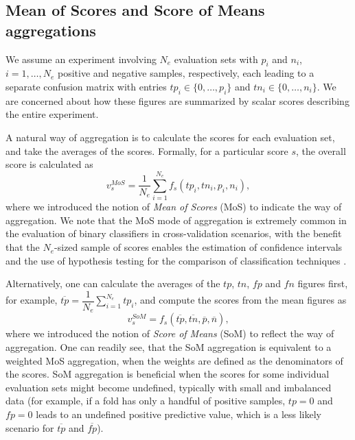 \documentclass[5p, final]{elsarticle}
\begin{document}
\subsection{Mean of Scores and Score of Means aggregations}
\label{sec:rommor}

We assume an experiment involving $N_e$ evaluation sets with $p_i$ and $n_i$, $i=1,\dots,N_e$ positive and negative samples, respectively, each leading to a separate confusion matrix with entries $tp_i \in\lbrace 0, \dots, p_i\rbrace$ and $tn_i\in\lbrace 0, \dots, n_i\rbrace$. We are concerned about how these figures are summarized by scalar scores describing the entire experiment. 

A natural way of aggregation is to calculate the scores for each evaluation set, and take the averages of the scores. Formally, for a particular score $s$, the overall score is calculated as
\begin{equation}
\label{estmor}
v_s^{MoS} = \dfrac{1}{N_e}\sum\limits_{i=1}^{N_e} f_s(tp_{i}, tn_{i}, p_{i}, n_{i}),
\end{equation}
where we introduced the notion of \emph{Mean of Scores} (MoS) to indicate the way of aggregation. We note that the MoS mode of aggregation is extremely common in the evaluation of binary classifiers in cross-validation scenarios, with the benefit that the $N_e$-sized sample of scores enables the estimation of confidence intervals \cite{morex2} and the use of  hypothesis testing for the comparison of classification techniques \cite{morex0}.

Alternatively, one can calculate the averages of the $tp$, $tn$, $fp$ and $fn$ figures first, for example, $\overline{tp} = \dfrac{1}{N_e}\sum\limits_{i=1}^{N_e} tp_i$, and compute the scores from the mean figures as
\begin{equation}
\label{estrom}
v_s^{SoM} = f_s\left(\overline{tp}, \overline{tn}, \overline{p}, \overline{n}\right),
\end{equation}
where we introduced the notion of \emph{Score of Means} (SoM) to reflect the way of aggregation. One can readily see, that the SoM aggregation is equivalent to a weighted MoS aggregation, when the weights are defined as the denominators of the scores. SoM aggregation is beneficial when the scores for some individual evaluation sets might become undefined, typically with small and imbalanced data \cite{romex0} (for example, if a fold has only a handful of positive samples, $tp=0$ and $fp=0$ leads to an undefined positive predictive value, which is a less likely scenario for $\overline{tp}$ and $\overline{fp}$).
\end{document}
